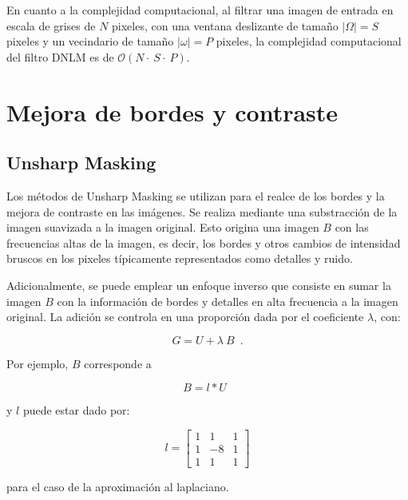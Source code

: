 En cuanto a la complejidad computacional, al filtrar una imagen de entrada en escala de grises de $N$ pixeles, con una ventana deslizante de tama\~no $|\Omega| = S$ pixeles y un vecindario de tama\~no $|\omega| = P$ pixeles, la complejidad computacional del filtro DNLM es de $\mathcal{O}(N\cdot~S\cdot~P)$. 



\section{Mejora de bordes y contraste}

\subsection{Unsharp Masking}
\label{ch:marco_usm}

Los métodos de Unsharp Masking se utilizan para el realce de los bordes y la mejora de contraste en las im\'agenes. Se realiza mediante una substracción de la imagen suavizada a la imagen original. Esto origina una imagen $B$ con las frecuencias altas de la imagen, es decir, los bordes y otros cambios de intensidad bruscos en los pixeles típicamente representados como detalles y ruido. 

Adicionalmente, se puede emplear un enfoque inverso que consiste en sumar la imagen $B$ con la información de bordes y detalles en alta frecuencia a la imagen original. La adición se controla en una proporción dada por el coeficiente $\lambda$, con:

\begin{equation}
\label{eq:unsharpmask}
G=U+\lambda~B \enspace .
\end{equation}

Por ejemplo, $B$ corresponde a

\begin{equation}
\label{eq:unsharfilter}
B=l*U \enspace 
\end{equation}

y $l$ puede estar dado por:

\begin{equation} l = \left[
\begin{array}{ccc}
1 & 1 & 1\\
1 & -8 & 1\\
1 & 1 & 1
\end{array}\right]
\end{equation}

para el caso de la aproximación al laplaciano.

